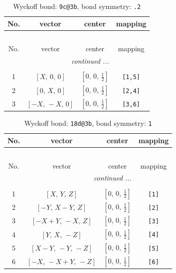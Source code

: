 \documentclass[fleqn,8pt]{jsarticle}
\begin{document}
\begin{longtable}{cccc}
\caption{Wyckoff bond: {\tt 9c@3b}, bond symmetry: {\tt .2}}
 \\
 \hline \hline
No. & vector & center & mapping \\ \hline \endfirsthead

\multicolumn{3}{l}{\tablename\ \thetable{}} \\
 \hline \hline
No. & vector & center & mapping \\ \hline \endhead

 \hline \hline
\multicolumn{3}{r}{\footnotesize\it continued ...} \\ \endfoot

 \hline \hline
\multicolumn{3}{r}{} \\ \endlastfoot

1 & $\left[ X,\, 0,\, 0 \right]$ & $\left[ 0,\, 0,\, \frac{1}{2} \right]$ & {\tt [1,5]} \\ \hline
2 & $\left[ 0,\, X,\, 0 \right]$ & $\left[ 0,\, 0,\, \frac{1}{2} \right]$ & {\tt [2,4]} \\ \hline
3 & $\left[ - X,\, - X,\, 0 \right]$ & $\left[ 0,\, 0,\, \frac{1}{2} \right]$ & {\tt [3,6]} \\
\end{longtable}
\renewcommand{\arraystretch}{1.2}
\begin{longtable}{cccc}
\caption{Wyckoff bond: {\tt 18d@3b}, bond symmetry: {\tt 1}}
 \\
 \hline \hline
No. & vector & center & mapping \\ \hline \endfirsthead

\multicolumn{3}{l}{\tablename\ \thetable{}} \\
 \hline \hline
No. & vector & center & mapping \\ \hline \endhead

 \hline \hline
\multicolumn{3}{r}{\footnotesize\it continued ...} \\ \endfoot

 \hline \hline
\multicolumn{3}{r}{} \\ \endlastfoot

1 & $\left[ X,\, Y,\, Z \right]$ & $\left[ 0,\, 0,\, \frac{1}{2} \right]$ & {\tt [1]} \\ \hline
2 & $\left[ - Y,\, X - Y,\, Z \right]$ & $\left[ 0,\, 0,\, \frac{1}{2} \right]$ & {\tt [2]} \\ \hline
3 & $\left[ - X + Y,\, - X,\, Z \right]$ & $\left[ 0,\, 0,\, \frac{1}{2} \right]$ & {\tt [3]} \\ \hline
4 & $\left[ Y,\, X,\, - Z \right]$ & $\left[ 0,\, 0,\, \frac{1}{2} \right]$ & {\tt [4]} \\ \hline
5 & $\left[ X - Y,\, - Y,\, - Z \right]$ & $\left[ 0,\, 0,\, \frac{1}{2} \right]$ & {\tt [5]} \\ \hline
6 & $\left[ - X,\, - X + Y,\, - Z \right]$ & $\left[ 0,\, 0,\, \frac{1}{2} \right]$ & {\tt [6]} \\
\end{longtable}
\end{document}
